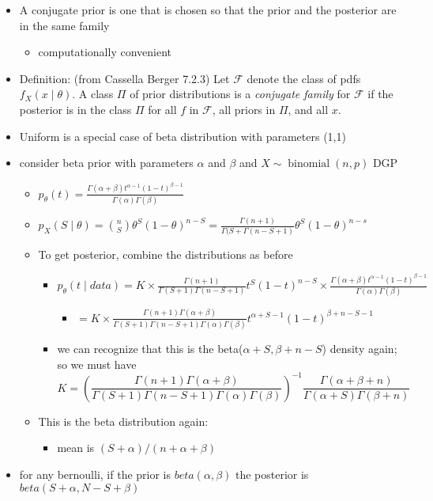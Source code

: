 \begin{itemize}
\item A conjugate prior is one that is chosen so that the prior and
       the posterior are in the same family
\begin{itemize}
\item computationally convenient
\end{itemize}
\item Definition: (from Cassella Berger 7.2.3)  Let $\mathcal{F}$ denote the class of pdfs $f_X(x \mid \theta)$.  A class $\Pi$
       of prior distributions is a \emph{conjugate family} for $\mathcal F$ if the posterior is in the class $\Pi$ for all $f$ in $\mathcal F$,
       all priors in $\Pi$, and all $x$.
\item Uniform is a special case of beta distribution with
       parameters (1,1)
\item consider beta prior with parameters $\alpha$ and $\beta$ and
       $X \sim \operatorname{binomial}(n,p)$ DGP
\begin{itemize}
\item $p_\theta(t) = \frac{\Gamma(\alpha + \beta) t^{\alpha-1}
         (1-t)^{\beta-1}}{\Gamma(\alpha) \Gamma(\beta)}$
     \item $p_{X}(S \mid \theta) = \binom{n}{S} \theta^S
       (1-\theta)^{n-S} = \frac{\Gamma(n + 1)}{\Gamma(S + \Gamma(n - S
         + 1)} \theta^S (1-\theta)^{n-s}$
\item To get posterior, combine the distributions as before
\begin{itemize}
\item $p_\theta(t \mid data) 
           = K \times \frac{\Gamma(n + 1)}{\Gamma(S + 1) \Gamma(n - S + 1)} t^S (1-t)^{n-S} \times \frac{\Gamma(\alpha + \beta) t^{\alpha-1} (1-t)^{\beta-1}}{\Gamma(\alpha) \Gamma(\beta)}$
\begin{itemize}
\item $= K \times \frac{\Gamma(n + 1) \Gamma(\alpha + \beta)}{\Gamma(S + 1) \Gamma(n - S + 1) \Gamma(\alpha) \Gamma(\beta)} t^{\alpha + S - 1} (1 - t)^{\beta + n - S - 1}$
\end{itemize}
\item we can recognize that this is the beta($\alpha + S, \beta + n - S$) density again; so we must have 
           \[ K = (\frac{\Gamma(n + 1) \Gamma(\alpha + \beta)}{\Gamma(S + 1) \Gamma(n - S + 1)\Gamma(\alpha)\Gamma(\beta)})^{-1} \frac{\Gamma(\alpha + \beta + n)}{\Gamma(\alpha + S)\Gamma(\beta + n)} \]
\end{itemize}
\item This is the beta distribution again:
\begin{itemize}
\item mean is $(S + \alpha) / (n + \alpha + \beta)$
\end{itemize}
\end{itemize}
\item for any bernoulli, if the prior is $beta(\alpha,\beta)$ the
       posterior is $beta(S + \alpha, N - S + \beta)$
\end{itemize}
